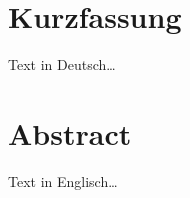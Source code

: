 \section*{Kurzfassung} 

Text in Deutsch\dots

\vspace{3cm}
\section*{Abstract} 

Text in Englisch\dots
